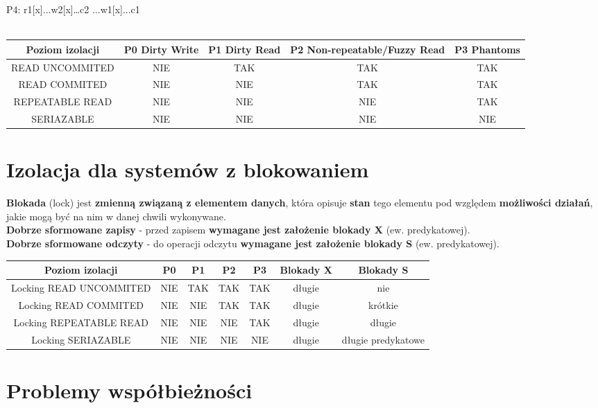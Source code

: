 \documentclass[a4paper]{article}
\begin{document}
P4: r1[x]...w2[x]…c2 ...w1[x]...c1\\\\

\begin{tabular}{|c|c|c|c|c|}
\hline
     Poziom izolacji & P0 Dirty Write & P1 Dirty Read & P2 Non-repeatable/Fuzzy Read & P3 Phantoms \\
\hline
     READ UNCOMMITED & NIE & TAK & TAK & TAK \\
\hline
    READ COMMITED & NIE & NIE & TAK & TAK \\
\hline
    REPEATABLE READ & NIE & NIE & NIE & TAK\\
\hline
    SERIAZABLE & NIE & NIE & NIE & NIE\\
\hline
\end{tabular}

\section{Izolacja dla systemów z blokowaniem}
\textbf{Blokada} (lock) jest \textbf{zmienną związaną z elementem danych}, która opisuje \textbf{stan} tego elementu
pod względem \textbf{możliwości działań}, jakie mogą być na nim w danej chwili wykonywane.\\

\textbf{Dobrze sformowane zapisy} - przed zapisem \textbf{wymagane jest założenie blokady X} (ew. predykatowej).\\
\textbf{Dobrze sformowane odczyty} - do operacji odczytu \textbf{wymagane jest założenie blokady S} (ew. predykatowej).\\

\begin{tabular}{|c|c|c|c|c|c|c| }
\hline
     Poziom izolacji & P0 & P1 & P2 & P3 & Blokady X & Blokady S \\
\hline
    Locking READ UNCOMMITED & NIE & TAK & TAK & TAK & długie & nie \\
\hline
    Locking READ COMMITED & NIE & NIE & TAK & TAK & długie & krótkie\\
\hline
    Locking REPEATABLE READ & NIE & NIE & NIE & TAK & długie & długie\\
\hline
    Locking SERIAZABLE & NIE & NIE & NIE & NIE & długie & długie predykatowe\\
\hline
\end{tabular}

\section{Problemy współbieżności}
\end{document}
